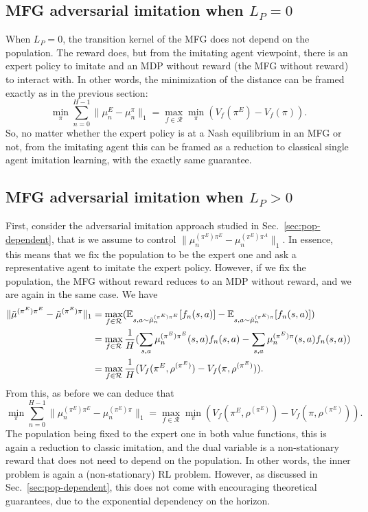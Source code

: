 \documentclass{article}
\begin{document}
\subsection{MFG adversarial imitation when $L_P=0$}

When $L_P=0$, the transition kernel of the MFG does not depend on the population. The reward does, but from the imitating agent viewpoint, there is an expert policy to imitate and an MDP without reward (the MFG without reward) to interact with. In other words, the minimization of the distance can be framed exactly as in the previous section:
\begin{equation}
    \min_\pi \sum_{n=0}^{H-1}\|\mu_n^E - \mu_n^\pi\|_1 = \max_{f\in\mathcal{R}} \min_\pi (V_f(\pi^E) - V_f(\pi)).
\end{equation}
So, no matter whether the expert policy is at a Nash equilibrium in an MFG or not, from the imitating agent this can be framed as a reduction to classical single agent imitation learning, with the exactly same guarantee.

\subsection{MFG adversarial imitation when $L_P>0$}

First, consider the adversarial imitation approach studied in Sec.~\ref{sec:pop-dependent}, that is we assume to control $\|\mu_n^{(\pi^E)\pi^{E}} - \mu_n^{(\pi^E)\pi^{A}}\|_1$. In essence, this means that we fix the population to be the expert one and ask a representative agent to imitate the expert policy. However, if we fix the population, the MFG without reward reduces to an MDP without reward, and we are again in the same case. We have
\begin{align}
    \|\tilde{\mu}^{(\pi^E)\pi^{E}} - \tilde{\mu}^{(\pi^E)\pi}\|_1 &= \max_{f\in \mathcal{R}} (\mathbb{E}_{s,a\sim\tilde{\mu}_n^{(\pi^E)\pi^{E}}}[f_n(s,a)]-\mathbb{E}_{s,a\sim\tilde{\mu}_n^{(\pi^E)\pi}}[f_n(s,a)])
    \\
    &= \max_{f\in \mathcal{R}} \frac{1}{H} (\sum_{s,a} \mu_n^{(\pi^E)\pi^{E}}(s,a) f_n(s,a) - \sum_{s,a} \mu_n^{(\pi^E)\pi}(s,a) f_n(s,a))
    \\
    &= \max_{f\in \mathcal{R}} \frac{1}{H} (V_f(\pi^E, \rho^{(\pi^E)}) - V_f(\pi, \rho^{(\pi^E)})).
\end{align}
From this, as before we can deduce that
\begin{equation}
    \min_\pi \sum_{n=0}^{H-1}\|\mu_n^{(\pi^E)\pi^{E}} - \mu_n^{(\pi^E)\pi}\|_1 = \max_{f\in\mathcal{R}} \min_\pi (V_f(\pi^E, \rho^{(\pi^E)}) - V_f(\pi, \rho^{(\pi^E)})).
\end{equation}
The population being fixed to the expert one in both value functions, this is again a reduction to classic imitation, and the dual variable is a non-stationary reward that does not need to depend on the population. In other words, the inner problem is again a (non-stationary) RL problem. However, as discussed in Sec.~\ref{sec:pop-dependent}, this does not come with encouraging theoretical guarantees, due to the exponential dependency on the horizon.
\end{document}
